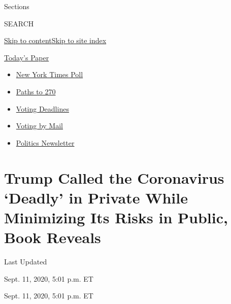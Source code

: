 Sections

SEARCH

\protect\hyperlink{site-content}{Skip to
content}\protect\hyperlink{site-index}{Skip to site index}

\href{https://myaccount.nytimes3xbfgragh.onion/auth/login?response_type=cookie\&client_id=vi}{}

\href{https://www.nytimes3xbfgragh.onion/section/todayspaper}{Today's
Paper}

\begin{itemize}
\item
  \href{https://www.nytimes3xbfgragh.onion/2020/09/12/us/politics/biden-trump-poll-wisconsin-minnesota.html?action=click\&pgtype=Article\&state=default\&region=TOP_BANNER\&context=storylines_menu}{New
  York Times Poll}
\item
  \href{https://www.nytimes3xbfgragh.onion/interactive/2020/us/elections/election-states-biden-trump.html?action=click\&pgtype=Article\&state=default\&region=TOP_BANNER\&context=storylines_menu}{Paths
  to 270}
\item
  \href{https://www.nytimes3xbfgragh.onion/interactive/2019/us/elections/2020-presidential-election-calendar.html?action=click\&pgtype=Article\&state=default\&region=TOP_BANNER\&context=storylines_menu}{Voting
  Deadlines}
\item
  \href{https://www.nytimes3xbfgragh.onion/interactive/2020/08/31/us/politics/vote-by-mail-deadlines.html?action=click\&pgtype=Article\&state=default\&region=TOP_BANNER\&context=storylines_menu}{Voting
  by Mail}
\item
  \href{https://www.nytimes3xbfgragh.onion/newsletters/politics?action=click\&pgtype=Article\&state=default\&region=TOP_BANNER\&context=storylines_menu}{Politics
  Newsletter}
\end{itemize}

\hypertarget{trump-called-the-coronavirus-deadly-in-private-while-minimizing-its-risks-in-public-book-reveals}{%
\section{Trump Called the Coronavirus `Deadly' in Private While
Minimizing Its Risks in Public, Book
Reveals}\label{trump-called-the-coronavirus-deadly-in-private-while-minimizing-its-risks-in-public-book-reveals}}

Last Updated

Sept. 11, 2020, 5:01 p.m. ET

Sept. 11, 2020, 5:01 p.m. ET

